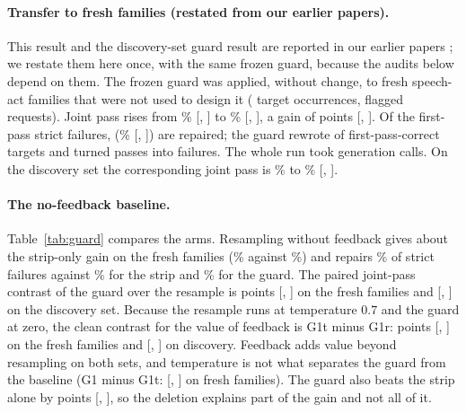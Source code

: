 \paragraph{Transfer to fresh families (restated from our earlier papers).}
This result and the discovery-set guard result are reported in our earlier papers \cite{concurrent_se4all,concurrent_caleai}; we restate them here once, with the same frozen guard, because the audits below depend on them.
The frozen guard was applied, without change, to \jmgtFamilies{} fresh speech-act families that were not used to design it (\jmgtTargets{} target occurrences, \jmgwFlaggedF{} flagged requests). Joint pass rises from \jmgtJointP{}\% [\jmgtJointPLo{}, \jmgtJointPHi{}] to \jmgtJointG{}\% [\jmgtJointGLo{}, \jmgtJointGHi{}], a gain of \jmgwGain{} points [\jmgwGainLo{}, \jmgwGainHi{}]. Of the \jmgwStrictRepairN{} first-pass strict failures, \jmgwStrictRepairK{} (\jmgwStrictRepair{}\% [\jmgwStrictRepairLo{}, \jmgwStrictRepairHi{}]) are repaired; the guard rewrote \jmgwChangedK{} of \jmgwChangedN{} first-pass-correct targets and turned \jmgwPassToFailK{} passes into failures. The whole run took \jmgwGenCalls{} generation calls. On the discovery set the corresponding joint pass is \jmgbDiscPZero{}\% to \jmgbDiscGOne{}\% [\jmgbDiscGOneLo{}, \jmgbDiscGOneHi{}].

\paragraph{The no-feedback baseline.}
Table~\ref{tab:guard} compares the arms. Resampling without feedback gives about the strip-only gain on the fresh families (\jmgbWcGOner{}\% against \jmgbWcGOnes{}\%) and repairs \jmgbWcRepairGOner{}\% of strict failures against \jmgbWcRepairGOnes{}\% for the strip and \jmgbWcRepairGOne{}\% for the guard. The paired joint-pass contrast of the guard over the resample is \jmgbCWcGOneMGOner{} points [\jmgbCWcGOneMGOnerLo{}, \jmgbCWcGOneMGOnerHi{}] on the fresh families and \jmgbCDiscGOneMGOner{} [\jmgbCDiscGOneMGOnerLo{}, \jmgbCDiscGOneMGOnerHi{}] on the discovery set. Because the resample runs at temperature $0.7$ and the guard at zero, the clean contrast for the value of feedback is G1t minus G1r: \jmgbCWcGOnetMGOner{} points [\jmgbCWcGOnetMGOnerLo{}, \jmgbCWcGOnetMGOnerHi{}] on the fresh families and \jmgbCDiscGOnetMGOner{} [\jmgbCDiscGOnetMGOnerLo{}, \jmgbCDiscGOnetMGOnerHi{}] on discovery. Feedback adds value beyond resampling on both sets, and temperature is not what separates the guard from the baseline (G1 minus G1t: \jmgbCWcGOneMGOnet{} [\jmgbCWcGOneMGOnetLo{}, \jmgbCWcGOneMGOnetHi{}] on fresh families). The guard also beats the strip alone by \jmgwGOneMinusGOnes{} points [\jmgwGOneMinusGOnesLo{}, \jmgwGOneMinusGOnesHi{}], so the deletion explains part of the gain and not all of it.

